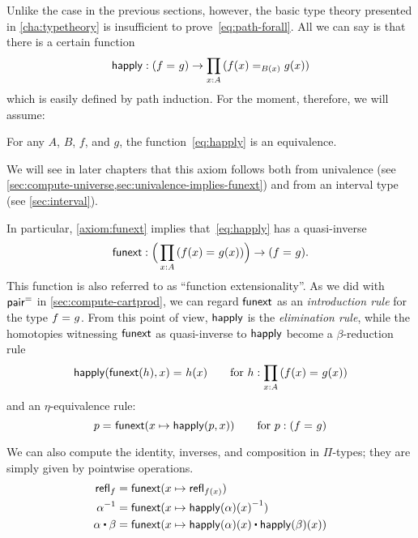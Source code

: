 Unlike the case in the previous sections, however, the basic type theory presented in \autoref{cha:typetheory} is insufficient to prove~\eqref{eq:path-forall}.
All we can say is that there is a certain function
\begin{equation}\label{eq:happly}
  \happly : (\id{f}{g}) \to \prd{x:A} (\id[B(x)]{f(x)}{g(x)})
\end{equation}
which is easily defined by path induction.
For the moment, therefore, we will assume:

\begin{axiom}\label{axiom:funext}
  For any $A$, $B$, $f$, and $g$, the function~\eqref{eq:happly} is an equivalence.
\end{axiom}

We will see in later chapters that this axiom follows both from univalence (see \autoref{sec:compute-universe,sec:univalence-implies-funext}) and from an interval type (see \autoref{sec:interval}).

In particular, \autoref{axiom:funext} implies that~\eqref{eq:happly} has a quasi-inverse
\[
\funext : \Big(\prd{x:A} (\id{f(x)}{g(x)})\Big) \to {(\id{f}{g})}.
\]
This function is also referred to as ``function extensionality''.
As we did with $\mathsf{pair}^{\mathord{=}}$ in \autoref{sec:compute-cartprod}, we can regard $\mathsf{funext}$ as an \emph{introduction rule} for the type $f =_{} g$.
From this point of view, $\mathsf{happly}$ is the \emph{elimination rule}, while the homotopies witnessing $\mathsf{funext}$ as quasi-inverse to $\mathsf{happly}$ become a $\beta$-reduction rule
\[
\id{\happly({\funext{(h)}},x)}{h(x)} \qquad\text{for }h:\prd{x:A} (\id{f(x)}{g(x)})
\]
and an $\eta$-equivalence rule:
\[
p =_{} \mathsf{funext} (x \mapsto \mathsf{happly}(p,{x})) \qquad\text{for } p: (f =_{} g)
\]

We can also compute the identity, inverses, and composition in $\Pi$-types; they are simply given by pointwise operations.
\begin{align*}
\refl{f} &= \funext(x \mapsto \refl{f(x)}) \\
\opp{\alpha} &= \funext (x \mapsto \opp{\happly (\alpha)(x)})  \\
{\alpha} \ct \beta &= \funext (x \mapsto {\happly({\alpha})(x) \ct \happly({\beta})(x)})
\end{align*}

